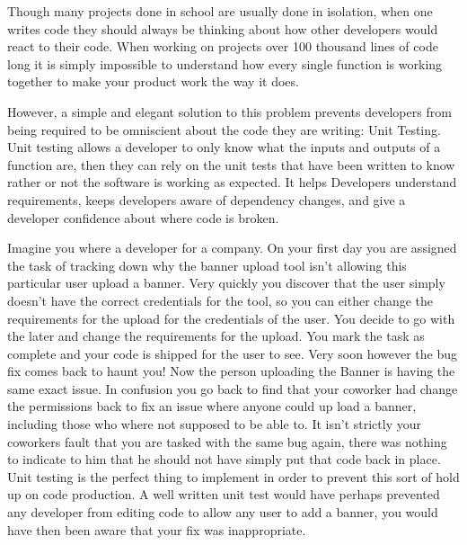 \documentclass[nociteref]{../../SIAM-GH-book}
\begin{document}
\mainmatter




Though many projects done in school are usually done in isolation, when one writes code they should always be thinking about how other developers would react to their code.
When working on projects over 100 thousand lines of code long it is simply impossible to understand how every single function is working together to make your product work the way it does.

However, a simple and elegant solution to this problem prevents developers from being required to be omniscient about the code they are writing: Unit Testing.
Unit testing allows a developer to only know what the inputs and outputs of a function are, then they can rely on the unit tests that have been written to know rather or not the software is working as expected.
It helps Developers understand requirements, keeps developers aware of dependency changes, and give a developer confidence about where code is broken.

Imagine you where a developer for a company. On your first day you are assigned the task of tracking down why the banner upload tool isn't allowing this particular user upload a banner.
Very quickly you discover that the user simply doesn't have the correct credentials for the tool, so you can either change the requirements for the upload for the credentials of the user.
You decide to go with the later and change the requirements for the upload. You mark the task as complete and your code is shipped for the user to see.
Very soon however the bug fix comes back to haunt you! Now the person uploading the Banner is having the same exact issue.
In confusion you go back to find that your coworker had change the permissions back to fix an issue where anyone could up load a banner, including those who where not supposed to be able to.
It isn't strictly your coworkers fault that you are tasked with the same bug again, there was nothing to indicate to him that he should not have simply put that code back in place.
Unit testing is the perfect thing to implement in order to prevent this sort of hold up on code production.
A well written unit test would have perhaps prevented any developer from editing code to allow any user to add a banner, you would have then been aware that your fix was inappropriate.
\end{document}
